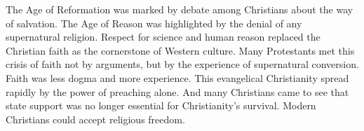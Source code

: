 
\begin{partsummary}
The Age of Reformation was marked by debate among Christians about the way of salvation. The Age of
Reason was highlighted by the denial of any supernatural religion. Respect for science and human
reason replaced the Christian faith as the cornerstone of Western culture. Many Protestants met this
crisis of faith not by arguments, but by the experience of supernatural conversion. Faith was less
dogma and more experience. This evangelical Christianity spread rapidly by the power of preaching
alone. And many Christians came to see that state support was no longer essential for Christianity’s
survival. Modern Christians could accept religious freedom.
\end{partsummary}

